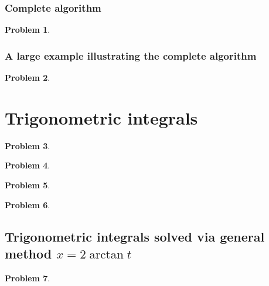 \documentclass{article}
\newtheorem{problem}{Problem}
\begin{document}
\subsubsection{Complete algorithm}
\begin{problem}

\end{problem}


\subsubsection{A large example illustrating the complete algorithm}
\begin{problem}

\end{problem}

\section{Trigonometric integrals}
\begin{problem}

\end{problem}

\begin{problem}

\end{problem}

\begin{problem}

\end{problem}

\begin{problem}

\end{problem}
\subsection{Trigonometric integrals solved via general method $x=2\arctan t$}
\begin{problem}

\end{problem}

\end{document}
